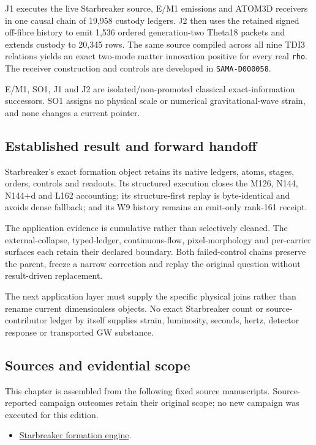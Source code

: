 J1 executes the live Starbreaker source, E/M1 emissions and ATOM3D
receivers in one causal chain of 19,958 custody ledgers. J2 then uses
the retained signed off-fibre history to emit 1,536 ordered
generation-two Theta18 packets and extends custody to 20,345 rows. The
same source compiled across all nine TDI3 relations yields an exact
two-mode matter innovation positive for every real \texttt{rho}. The
receiver construction and controls are developed in
\texttt{SAMA-D000058}.

E/M1, SO1, J1 and J2 are isolated/non-promoted classical
exact-information successors. SO1 assigns no physical scale or numerical
gravitational-wave strain, and none changes a current pointer.

\subsection{Established result and forward
handoff}\label{viii-ch08-established-result-and-forward-handoff}

Starbreaker's exact formation object retains its native ledgers, atoms,
stages, orders, controls and readouts. Its structured execution closes
the M126, N144, N144+d and L162 accounting; its structure-first replay
is byte-identical and avoids dense fallback; and its W9 history remains
an emit-only rank-161 receipt.

The application evidence is cumulative rather than selectively cleaned.
The external-collapse, typed-ledger, continuous-flow, pixel-morphology
and per-carrier surfaces each retain their declared boundary. Both
failed-control chains preserve the parent, freeze a narrow correction
and replay the original question without result-driven replacement.

The next application layer must supply the specific physical joins
rather than rename current dimensionless objects. No exact Starbreaker
count or source-contributor ledger by itself supplies strain,
luminosity, seconds, hertz, detector response or transported GW
substance.

\subsection{Sources and evidential
scope}\label{viii-ch08-sources-and-evidential-scope}

This chapter is assembled from the following fixed source manuscripts.
Source-reported campaign outcomes retain their original scope; no new
campaign was executed for this edition.

\begin{itemize}
\tightlist
\item
  \href{https://github.com/iwtbotiwtwot/SAMA/blob/4c2b5dc1649da5900c90b90d0ce56c223dbb7717/vol_iii/04-starbreaker/starbreaker-formation-engine.md}{Starbreaker
  formation engine}.
\end{itemize}
